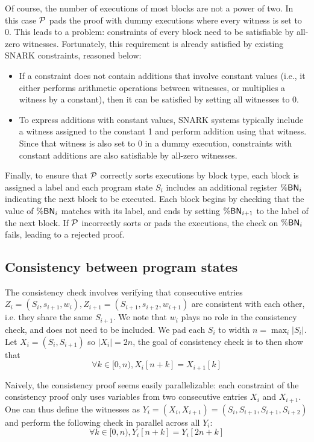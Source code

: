 Of course, the number of executions of most blocks are not a power of two. In this case $\P$ pads the proof with dummy executions where every witness is set to 0. This leads to a problem: constraints of every block need to be satisfiable by all-zero witnesses. Fortunately, this requirement is already satisfied by existing SNARK constraints, reasoned below:
\begin{itemize}
    \item If a constraint does not contain additions that involve constant values (i.e., it either performs arithmetic operations between witnesses, or multiplies a witness by a constant), then it can be satisfied by setting all witnesses to 0.
    \item To express additions with constant values, SNARK systems typically include a witness assigned to the constant 1 and perform addition using that witness. Since that witness is also set to 0 in a dummy execution, constraints with constant additions are also satisfiable by all-zero witnesses.
\end{itemize}

Finally, to ensure that $\P$ correctly sorts executions by block type, each block is assigned a label and each program state $S_i$ includes an additional register $\bn_i$ indicating the next block to be executed. Each block begins by checking that the value of $\bn_i$ matches with its label, and ends by setting $\bn_{i+1}$ to the label of the next block. If $\P$ incorrectly sorts or pads the executions, the check on $\bn_i$ fails, leading to a rejected proof.

\subsection{Consistency between program states} \label{sec:consistency}
The consistency check involves verifying that consecutive entries $Z_i = (S_i, s_{i+1}, w_i), Z_{i+1} = (S_{i+1}, s_{i+2}, w_{i+1})$ are consistent with each other, i.e. they share the same $S_{i+1}$. We note that $w_i$ plays no role in the consistency check, and does not need to be included. We pad each $S_i$ to width $n = \max_i|S_i|$. Let $X_i = (S_i, S_{i+1})$ so $|X_i| = 2n$, the goal of consistency check is to then show that
$$\forall k\in [0, n), X_i[n + k] = X_{i+1}[k]$$

Naively, the consistency proof seems easily parallelizable: each constraint of the consistency proof only uses variables from two consecutive entries $X_i$ and $X_{i+1}$. One can thus define the witnesses as $Y_i = (X_i, X_{i+1}) = (S_i, S_{i+1}, S_{i+1}, S_{i+2})$ and perform the following check in parallel across all $Y_i$:
$$\forall k\in [0, n), Y_i[n + k] = Y_i[2n + k]$$

